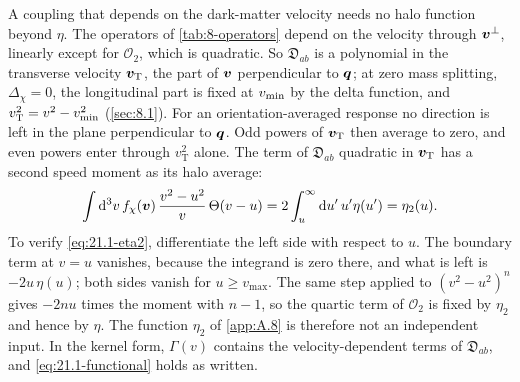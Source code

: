 A coupling that depends on the dark-matter velocity needs no halo function beyond $\eta$. The operators of \cref{tab:8-operators} depend on the velocity through $\bm{v}^\perp$, linearly except for $\mathcal{O}_2$, which is quadratic. So $\mathfrak{D}_{ab}$ is a polynomial in the transverse velocity $\bm{v}_{\mathrm{T}}$, the part of $\bm{v}$ perpendicular to $\bm{q}$; at zero mass splitting, $\Delta_\chi = 0$, the longitudinal part is fixed at $v_{\mathrm{min}}$ by the delta function, and $v_{\mathrm{T}}^2 = v^2 - v_{\mathrm{min}}^2$ (\cref{sec:8.1}). For an orientation-averaged response no direction is left in the plane perpendicular to $\bm{q}$. Odd powers of $\bm{v}_{\mathrm{T}}$ then average to zero, and even powers enter through $v_{\mathrm{T}}^2$ alone. The term of $\mathfrak{D}_{ab}$ quadratic in $\bm{v}_{\mathrm{T}}$ has a second speed moment as its halo average:
\begin{equation}
  \int\mathrm{d}^3v\,f_\chi(\bm{v})\,\frac{v^2 - u^2}{v}\,\Theta(v - u) = 2\int_u^\infty\mathrm{d} u'\,u'\eta(u') = \eta_2(u) .
  \label{eq:21.1-eta2}
\end{equation}
To verify \cref{eq:21.1-eta2}, differentiate the left side with respect to $u$. The boundary term at $v = u$ vanishes, because the integrand is zero there, and what is left is $-2u\,\eta(u)$; both sides vanish for $u \ge v_{\mathrm{max}}$. The same step applied to $(v^2 - u^2)^n$ gives $-2nu$ times the moment with $n - 1$, so the quartic term of $\mathcal{O}_2$ is fixed by $\eta_2$ and hence by $\eta$. The function $\eta_2$ of \cref{app:A.8} is therefore not an independent input. In the kernel form, $\varGamma(v)$ contains the velocity-dependent terms of $\mathfrak{D}_{ab}$, and \cref{eq:21.1-functional} holds as written.


